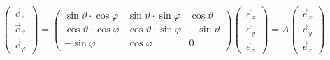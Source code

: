 \documentclass[a4paper,10pt]{scrartcl}
\begin{document}
            \begin{equation*}
                \begin{pmatrix}
                    \vec{e}_r \\ \vec{e}_\vartheta \\ \vec{e}_\varphi 
                \end{pmatrix} = 
                \begin{pmatrix}
                    \sin \vartheta \cdot \cos \varphi & \sin \vartheta \cdot \sin \varphi & \cos \vartheta \\
                    \cos \vartheta \cdot \cos \varphi & \cos \vartheta \cdot \sin \varphi & - \sin \vartheta \\
                    -\sin \varphi & \cos \varphi & 0
                \end{pmatrix}
                \begin{pmatrix}
                    \vec{e}_x \\ \vec{e}_y \\ \vec{e}_z
                \end{pmatrix} = A
                \begin{pmatrix}
                    \vec{e}_x \\ \vec{e}_y \\ \vec{e}_z
                \end{pmatrix}
            \end{equation*}
\end{document}
